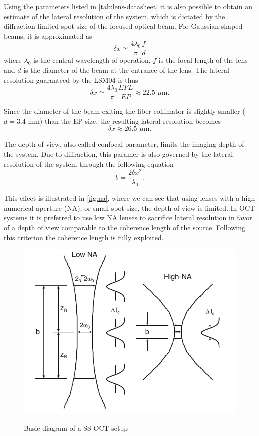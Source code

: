  Using the parameters listed in \autoref{tab:lens-datasheet} it is also possible to obtain an estimate of the lateral resolution of the system, which is dictated by the diffraction limited spot size of the focused optical beam. For Gaussian-shaped beams, it is approximated as \cite{Drexler2015}
 \begin{equation}
 	\delta x \simeq \frac{4\lambda_0}{\pi} \frac{f}{d}
 \end{equation}
 where $\lambda_0$ is the central wavelength of operation, $f$ is the focal length of the lens and $d$ is the diameter of the beam at the entrance of the lens. The lateral resolution guaranteed by the LSM04 is thus
 \begin{equation}
 	\delta x \simeq \frac{4\lambda_0}{\pi} \frac{EFL}{EP} \approx 22.5 \,\,\mu\text{m.}
 \end{equation}
 
 Since the diameter of the beam exiting the fiber collimator is slightly smaller ($d=3.4$ mm) than the EP size, the resulting lateral resolution becomes
 \begin{equation}
	\delta x \approx 26.5 \,\,\mu\text{m}.
 \end{equation}
 
 The depth of view, also called confocal parameter, limits the imaging depth of the system. Due to diffraction, this paramer is also governed by the lateral resolution of the system through the following equation
 \begin{equation}
	 b = \frac{2 \delta x^2}{\lambda_0}.
 \end{equation}
 
 This effect is illustrated in \autoref{fig:na}, where we can see that using lenses with a high numerical aperture (NA), or small spot size, the depth of view is limited. In OCT systems it is preferred to use low NA lenses to sacrifice lateral resolution in favor of a depth of view comparable to the coherence length of the source. Following this criterion the coherence length is fully exploited. 
 
  \begin{figure}[bth]
 	\myfloatalign
 	{\includegraphics[width=0.6\linewidth]{gfx/ch3/na}}
 	\caption{Basic diagram of a  SS-OCT setup}\label{fig:na}
 \end{figure}
 
